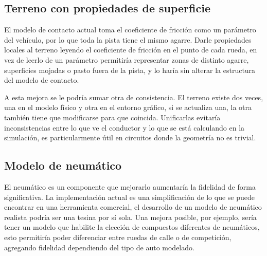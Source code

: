 
\subsection{Terreno con propiedades de superficie}

El modelo de contacto actual toma el coeficiente de fricción como un parámetro del vehículo, por lo que toda la pista tiene el mismo agarre. Darle propiedades locales al terreno leyendo el coeficiente de fricción en el punto de cada rueda, en vez de leerlo de un parámetro permitiría representar zonas de distinto agarre, superficies mojadas o pasto fuera de la pista, y lo haría sin alterar la estructura del modelo de contacto.

A esta mejora se le podría sumar otra de consistencia. El terreno existe dos veces, una en el modelo físico y otra en el entorno gráfico, si se actualiza una, la otra también tiene que modificarse para que coincida. Unificarlas evitaría inconsistencias entre lo que ve el conductor y lo que se está calculando en la simulación, es particularmente útil en circuitos donde la geometría no es trivial.


\subsection{Modelo de neumático}

El neumático es un componente que mejorarlo aumentaría la fidelidad de forma significativa. La implementación actual es una simplificación de lo que se puede encontrar en una herramienta comercial, el desarrollo de un modelo de neumático realista podría ser una tesina por sí sola. Una mejora posible, por ejemplo, sería tener un modelo que habilite la elección de compuestos diferentes de neumáticos, esto permitiría poder diferenciar entre ruedas de calle o de competición, agregando fidelidad dependiendo del tipo de auto modelado.



